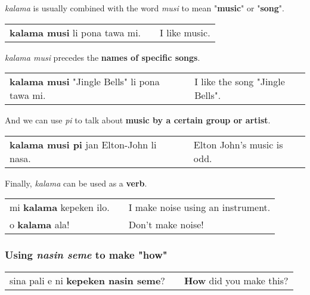 \textit{kalama} is usually combined with the word \textit{musi} to mean "\textbf{music}" or "\textbf{song}". \\
\begin{supertabular}{p{5,5cm}|ll}
\textbf{kalama musi} li pona tawa mi. && I like music. \\
\end{supertabular}  

\textit{kalama musi} precedes the \textbf{names of specific songs}. \\
\begin{supertabular}{p{5,5cm}|ll}
\textbf{kalama musi} "Jingle Bells" li pona tawa mi. && I like the song "Jingle Bells". \\
\end{supertabular}  

And we can use \textit{pi} to talk about \textbf{music by a certain group or artist}. \\
\begin{supertabular}{p{5,5cm}|ll}
\textbf{kalama musi pi} jan Elton-John li nasa. && Elton John's music is odd. \\
\end{supertabular}  

Finally, \textit{kalama} can be used as a \textbf{verb}. \\
\begin{supertabular}{p{5,5cm}|ll}
mi \textbf{kalama} kepeken ilo. && I make noise using an instrument. \\
o \textbf{kalama} ala! && Don't make noise! \\
\end{supertabular}  
%
\subsubsection*{Using \textit{nasin seme} to make "how"}
%
\begin{supertabular}{p{5,5cm}|ll}
sina pali e ni \textbf{kepeken nasin seme}? && \textbf{How} did you make this? \\
\end{supertabular}  
%
%
